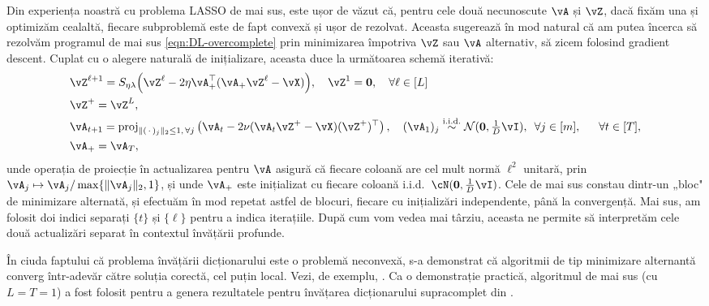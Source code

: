 \documentclass[../../book-main_ro.tex]{subfiles}
\begin{document}
Din experiența noastră cu problema LASSO de mai sus, este ușor de văzut că, pentru
cele două necunoscute \(\vA\) și \(\vZ\), dacă fixăm una și optimizăm cealaltă, fiecare
subproblemă este de fapt convexă și ușor de rezolvat. Aceasta sugerează în mod natural că am
putea încerca să rezolvăm programul de mai sus \eqref{eqn:DL-overcomplete} prin
minimizarea împotriva \(\vZ\) sau \(\vA\) alternativ, să zicem folosind gradient descent.
Cuplat cu o alegere naturală de inițializare, aceasta duce la următoarea
schemă iterativă:
\begin{align}
    &\vZ^{\ell + 1} = S_{\eta\lambda}\rp{\vZ^{\ell}
    - 2\eta\vA_{+}^{\top}(\vA_{+}\vZ^{\ell} - \vX)},
    \quad \vZ^1 = \Zero,
    \quad \forall \ell \in [L] \label{eqn:ISTA-update}\\ 
    &\vZ^+ = \vZ^L,\\
    &\vA_{t + 1} = \proj_{\norm{(\,\cdot\,)_j}_2 \leq 1,\,\forall j}\left(
    \vA_{t} - 2\nu (\vA_{t}\vZ^+ - \vX)(\vZ^+)^\top
    \right), 
    \quad (\vA_{1})_j \simiid \dNorm(\vzero, \tfrac{1}{D}\vI), \enspace \forall
    j \in [m], 
    \quad\;\; \forall t \in [T],\label{eqn:DL-update}\\
    &\vA_+ = \vA_T,
\end{align}
unde operația de proiecție în actualizarea pentru $\vA$ asigură că fiecare coloană are
cel mult normă $\ell^2$ unitară, prin $\vA_j \mapsto \vA_j / \max \set{\norm{\vA_j}_2,
1}$, și unde $\vA_+$ este inițializat cu fiecare coloană i.i.d.\ $\cN(\Zero,
\tfrac{1}{D} \vI)$.
Cele de mai sus constau dintr-un „bloc" de minimizare alternată, și efectuăm în mod repetat
astfel de blocuri, fiecare cu inițializări independente, până la convergență.
Mai sus, am folosit doi indici separați $\{t\}$ și $\{\ell\}$ pentru a indica
iterațiile. După cum vom vedea mai târziu, aceasta ne permite să interpretăm cele două actualizări
separat în contextul învățării profunde.

În ciuda faptului că problema învățării dicționarului este o problemă neconvexă, s-a
demonstrat că algoritmii de tip minimizare alternantă converg într-adevăr către
soluția corectă, cel puțin local. Vezi, de exemplu, \cite{alekh-2016}.
Ca o demonstrație practică, algoritmul de mai sus (cu $L = T = 1$) a fost folosit pentru
a genera rezultatele pentru învățarea dicționarului supracomplet din
.
\end{document}
